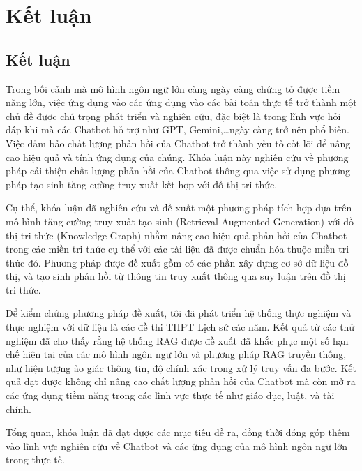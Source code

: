 \chapter{Kết luận}
\label{chap:conclusions}
\section{Kết luận}
\label{sec:conclusion}
Trong bối cảnh mà mô hình ngôn ngữ lớn càng ngày càng chứng tỏ được tiềm năng lớn, việc ứng dụng vào các ứng dụng vào các bài toán thực tế trở thành một chủ đề được chú trọng phát triển và nghiên cứu, đặc biệt là trong lĩnh vực hỏi đáp khi mà các Chatbot hỗ trợ như GPT, Gemini,\dots ngày càng trở nên phổ biến. Việc đảm bảo chất lượng phản hồi của Chatbot trở thành yếu tố cốt lõi để nâng cao hiệu quả và tính ứng dụng của chúng. Khóa luận này nghiên cứu về phương pháp cải thiện chất lượng phản hồi của Chatbot thông qua việc sử dụng phương pháp tạo sinh tăng cường truy xuất kết hợp với đồ thị tri thức.

Cụ thể, khóa luận đã nghiên cứu và đề xuất một phương pháp tích hợp dựa trên mô hình tăng cường truy xuất tạo sinh (Retrieval-Augmented Generation) với đồ thị tri thức (Knowledge Graph) nhằm nâng cao hiệu quả phản hồi của Chatbot trong các miền tri thức cụ thể với các tài liệu đã được chuẩn hóa thuộc miền tri thức đó. Phương pháp được đề xuất gồm có các phần xây dựng cơ sở dữ liệu đồ thị, và tạo sinh phản hồi từ thông tin truy xuất thông qua suy luận trên đồ thị tri thức.

Để kiểm chứng phương pháp đề xuất, tôi đã phát triển hệ thống thực nghiệm và thực nghiệm với dữ liệu là các đề thi THPT Lịch sử các năm. Kết quả từ các thử nghiệm đã cho thấy rằng hệ thống RAG được đề xuất đã khắc phục một số hạn chế hiện tại của các mô hình ngôn ngữ lớn và phương pháp RAG truyền thống, như hiện tượng ảo giác thông tin, độ chính xác trong xử lý truy vấn đa bước. Kết quả đạt được không chỉ nâng cao chất lượng phản hồi của Chatbot mà còn mở ra các ứng dụng tiềm năng trong các lĩnh vực thực tế như giáo dục, luật, và tài chính.

Tổng quan, khóa luận đã đạt được các mục tiêu đề ra, đồng thời đóng góp thêm vào lĩnh vực nghiên cứu về Chatbot và các ứng dụng của mô hình ngôn ngữ lớn trong thực tế.
